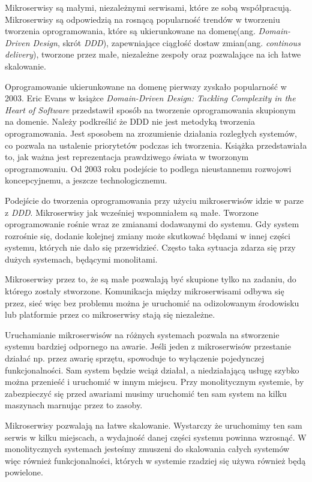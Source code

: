 Mikroserwisy są małymi, niezależnymi serwisami, które ze sobą współpracują\cite{newman}. Mikroserwisy są odpowiedzią na rosnącą popularność trendów w tworzeniu tworzenia oprogramowania, które są ukierunkowane na domenę(ang. \textsl{Domain-Driven Design}, skrót \textsl{DDD}), zapewniające ciągłość dostaw zmian(ang. \textsl{continous delivery}), tworzone przez małe, niezależne zespoły oraz pozwalające na ich łatwe skalowanie. 

Oprogramowanie ukierunkowane na domenę pierwszy zyskało popularność w 2003. Eric Evans w książce \textsl{Domain-Driven Design: Tackling Complexity in the Heart of Software}\cite{ddd} przedstawił sposób na tworzenie oprogramowania skupionym na domenie. Należy podkreślić że DDD nie jest metodyką tworzenia oprogramowania. Jest sposobem na zrozumienie działania rozległych systemów, co pozwala na ustalenie priorytetów podczas ich tworzenia. Książka przedstawiała to, jak ważna jest reprezentacja prawdziwego świata w tworzonym oprogramowaniu. Od 2003 roku podejście to podlega nieustannemu rozwojowi koncepcyjnemu, a jeszcze technologicznemu.

Podejście do tworzenia oprogramowania przy użyciu mikroserwisów idzie w parze z \textsl{DDD}. Mikroserwisy jak wcześniej wspomniałem są małe. Tworzone oprogramowanie rośnie wraz ze zmianami dodawanymi do systemu. Gdy system rozrośnie się, dodanie kolejnej zmiany może skutkować błędami w innej części systemu, których nie dało się przewidzieć. Często taka sytuacja zdarza się przy dużych systemach, będącymi monolitami.

Mikroserwisy przez to, że są małe pozwalają być skupione tylko na zadaniu, do którego zostały stworzone. Komunikacja między mikroserwisami odbywa się przez, sieć więc bez problemu można je uruchomić na odizolowanym środowisku lub platformie przez co mikroserwisy stają się niezależne. 

 Uruchamianie mikroserwisów na różnych systemach pozwala na stworzenie systemu bardziej odpornego na awarie. Jeśli jeden z mikroserwisów przestanie działać np. przez awarię sprzętu, spowoduje to wyłączenie pojedynczej funkcjonalności. Sam system będzie wciąż działał, a niedziałającą usługę szybko można przenieść i uruchomić w innym miejscu. Przy monolitycznym systemie, by zabezpieczyć się przed awariami musimy uruchomić ten sam system na kilku maszynach marnując przez to zasoby.

Mikroserwisy pozwalają na łatwe skalowanie. Wystarczy że uruchomimy ten sam serwis w kilku miejscach, a wydajność danej części systemu powinna wzrosnąć. W monolitycznych systemach jesteśmy zmuszeni do skalowania całych systemów więc również funkcjonalności, których w systemie rzadziej się używa również będą powielone.

